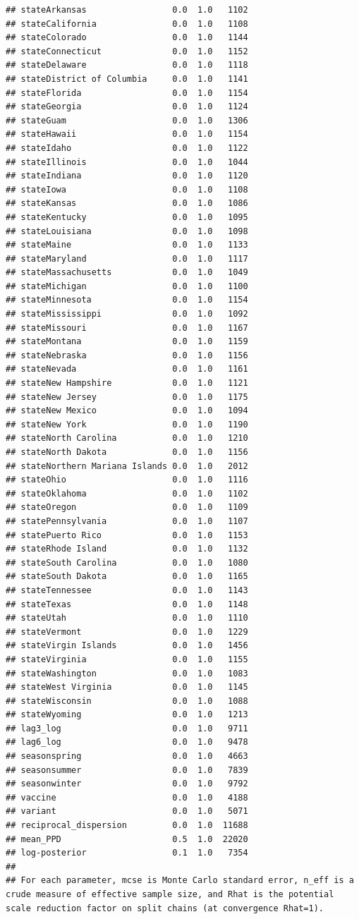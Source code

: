 \documentclass[
]{book}
\begin{document}
\begin{verbatim}
## stateArkansas                 0.0  1.0   1102
## stateCalifornia               0.0  1.0   1108
## stateColorado                 0.0  1.0   1144
## stateConnecticut              0.0  1.0   1152
## stateDelaware                 0.0  1.0   1118
## stateDistrict of Columbia     0.0  1.0   1141
## stateFlorida                  0.0  1.0   1154
## stateGeorgia                  0.0  1.0   1124
## stateGuam                     0.0  1.0   1306
## stateHawaii                   0.0  1.0   1154
## stateIdaho                    0.0  1.0   1122
## stateIllinois                 0.0  1.0   1044
## stateIndiana                  0.0  1.0   1120
## stateIowa                     0.0  1.0   1108
## stateKansas                   0.0  1.0   1086
## stateKentucky                 0.0  1.0   1095
## stateLouisiana                0.0  1.0   1098
## stateMaine                    0.0  1.0   1133
## stateMaryland                 0.0  1.0   1117
## stateMassachusetts            0.0  1.0   1049
## stateMichigan                 0.0  1.0   1100
## stateMinnesota                0.0  1.0   1154
## stateMississippi              0.0  1.0   1092
## stateMissouri                 0.0  1.0   1167
## stateMontana                  0.0  1.0   1159
## stateNebraska                 0.0  1.0   1156
## stateNevada                   0.0  1.0   1161
## stateNew Hampshire            0.0  1.0   1121
## stateNew Jersey               0.0  1.0   1175
## stateNew Mexico               0.0  1.0   1094
## stateNew York                 0.0  1.0   1190
## stateNorth Carolina           0.0  1.0   1210
## stateNorth Dakota             0.0  1.0   1156
## stateNorthern Mariana Islands 0.0  1.0   2012
## stateOhio                     0.0  1.0   1116
## stateOklahoma                 0.0  1.0   1102
## stateOregon                   0.0  1.0   1109
## statePennsylvania             0.0  1.0   1107
## statePuerto Rico              0.0  1.0   1153
## stateRhode Island             0.0  1.0   1132
## stateSouth Carolina           0.0  1.0   1080
## stateSouth Dakota             0.0  1.0   1165
## stateTennessee                0.0  1.0   1143
## stateTexas                    0.0  1.0   1148
## stateUtah                     0.0  1.0   1110
## stateVermont                  0.0  1.0   1229
## stateVirgin Islands           0.0  1.0   1456
## stateVirginia                 0.0  1.0   1155
## stateWashington               0.0  1.0   1083
## stateWest Virginia            0.0  1.0   1145
## stateWisconsin                0.0  1.0   1088
## stateWyoming                  0.0  1.0   1213
## lag3_log                      0.0  1.0   9711
## lag6_log                      0.0  1.0   9478
## seasonspring                  0.0  1.0   4663
## seasonsummer                  0.0  1.0   7839
## seasonwinter                  0.0  1.0   9792
## vaccine                       0.0  1.0   4188
## variant                       0.0  1.0   5071
## reciprocal_dispersion         0.0  1.0  11688
## mean_PPD                      0.5  1.0  22020
## log-posterior                 0.1  1.0   7354
## 
## For each parameter, mcse is Monte Carlo standard error, n_eff is a crude measure of effective sample size, and Rhat is the potential scale reduction factor on split chains (at convergence Rhat=1).
\end{verbatim}
\end{document}
